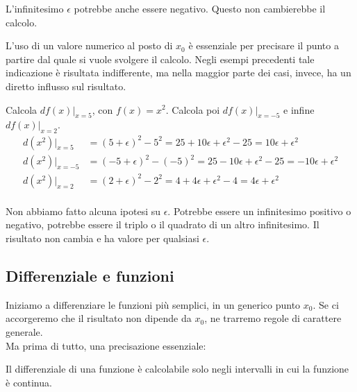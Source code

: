 \begin{osservazione}
 L'infinitesimo $\epsilon$ potrebbe anche essere negativo. Questo non cambierebbe 
 il calcolo.\\
\end{osservazione}

L'uso di un valore numerico al posto di $x_0$ è essenziale per precisare il
punto a partire dal quale si vuole svolgere il calcolo. Negli esempi precedenti
tale indicazione è risultata indifferente, ma nella maggior parte dei casi, invece, 
ha un diretto influsso sul risultato.\\

\begin{esempio}
 Calcola $df(x)|_{x=5}$, con $f(x)=x^2$. Calcola poi $df(x)|_{x=-5}$ e infine $df(x)|_{x=2}$.
 \begin{align*} 
  d(x^2)|_{x=5} & =(5+\epsilon)^2-5^2=25+10\epsilon+\epsilon^2-25=10\epsilon+\epsilon^2\\
  d(x^2)|_{x=-5}& =(-5+\epsilon)^2-(-5)^2=25-10\epsilon+\epsilon^2-25=-10\epsilon+\epsilon^2\\
  d(x^2)|_{x=2} & =(2+\epsilon)^2-2^2=4+4\epsilon+\epsilon^2-4=4\epsilon+\epsilon^2\\
 \end{align*}
\end{esempio}


\begin{osservazione}
 Non abbiamo fatto alcuna ipotesi su $\epsilon$. Potrebbe essere un infinitesimo positivo 
 o negativo, potrebbe essere il triplo o il quadrato di un altro infinitesimo. Il risultato 
 non cambia e ha valore per qualsiasi $\epsilon$.
\end{osservazione}



\subsection{Differenziale e funzioni}
\label{subsec:diff01_difffun}
Iniziamo a differenziare le funzioni più semplici, in un generico punto $x_0$.
Se ci accorgeremo che il risultato non dipende da $x_0$, ne trarremo regole
di carattere generale.\\
Ma prima di tutto, una precisazione essenziale:

\begin{osservazione}
 Il differenziale di una funzione è calcolabile solo negli intervalli in cui
 la funzione è continua.
\end{osservazione}

